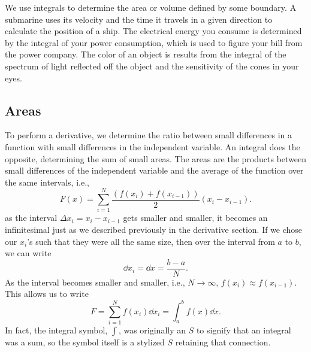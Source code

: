 \documentclass[final,a4paper,12pt]{article}
\theoremstyle{definition}
\begin{document}
We use integrals to determine the area or volume defined by some boundary.  A
submarine uses its velocity and the time it travels in a given direction to
calculate the position of a ship.  The electrical energy you consume is
determined by the integral of your power consumption, which is used to figure
your bill from the power company.  The color of an object is results from the
integral of the spectrum of light reflected off the object and the sensitivity
of the cones in your eyes.

\subsection{Areas}
To perform a derivative, we determine the ratio between small differences in a
function with small differences in the independent variable.  An integral does
the opposite, determining the sum of small areas.  The areas are the products
between small differences of the independent variable and the average of the
function over the same intervals, i.e.,
\begin{equation*}
    F(x) = \sum_{i = 1}^{N} \frac{(f(x_i) + f(x_{i-1}))}{2} (x_i - x_{i-1}) .
\end{equation*}
as the interval $\Delta x_i = x_i - x_{i-1}$ gets smaller and smaller, it becomes
an infinitesimal just as we described previously in the derivative section.  If
we chose our $x_i$'s such that they were all the same size, then over the
interval from $a$ to $b$, we can write
\begin{equation*}
    \dd{x_i} = \dd{x} = \frac{b - a}{N} .
\end{equation*}
As the interval becomes smaller and smaller, i.e., $N \to \infty$, $f(x_i)
\approx f(x_{i-1})$.  This allows us to write
\begin{equation*}
    F = \sum_{i = 1}^{N} f(x_i) \dd{x_i} = \int_a^b f(x) \dd{x} .
\end{equation*}
In fact, the integral symbol, $\int$, was originally an $S$ to signify that an
integral was a sum, so the symbol itself is a stylized $S$ retaining that
connection.
\end{document}
